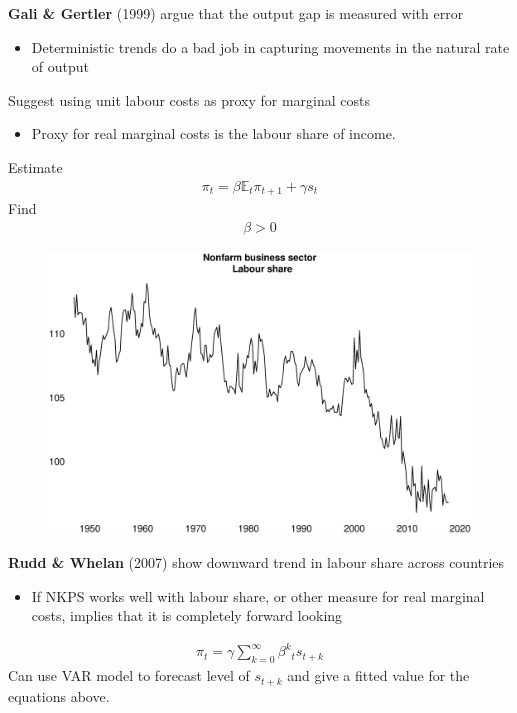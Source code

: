\documentclass{beamer}
\begin{document}
\begin{frame}
  \textbf{Gali \& Gertler} (1999) argue that the output gap is measured with error
  \begin{itemize}
    \item Deterministic trends do a bad job in capturing movements in the natural rate of output
  \end{itemize}
  \medskip
  Suggest using unit labour costs as proxy for marginal costs
  \begin{itemize}
    \item Proxy for real marginal costs is the labour share of income.
  \end{itemize}
  Estimate 
  \begin{align}
   \pi_t = \beta \mathbb{E}_t \pi_{t+1} + \gamma s_t    
  \end{align}
  Find
  \begin{align}
    \beta>0
  \end{align} 
\end{frame}

\begin{frame}
  \begin{figure}
    \includegraphics[scale=.25]{labour_share.eps}
  \end{figure}
\end{frame}

\begin{frame}
\textbf{Rudd \& Whelan} (2007) show downward trend in labour share across countries
\begin{itemize}
  \item If NKPS works well with labour share, or other measure for real marginal costs, implies that it is completely forward looking
\end{itemize} 
\begin{align}
  \pi_t = \gamma \sum_{k=0}^{\infty} \beta^k \mathbb{}_t s_{t+k}
\end{align}
Can use VAR model to forecast level of $s_{t+k}$ and give a fitted value for the equations above.
\end{frame}
\end{document}

